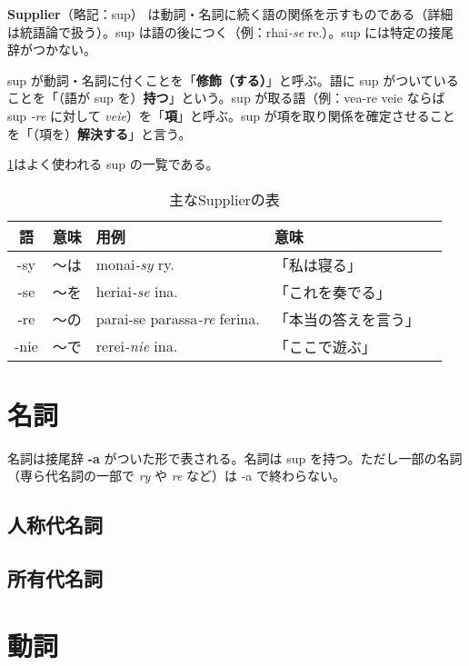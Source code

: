\textbf{Supplier}（略記：sup） は動詞・名詞に続く語の関係を示すものである（詳細は統語論で扱う）。sup は語の後につく（例：rhai\emph{-se} re.）。sup には特定の接尾辞がつかない。

sup が動詞・名詞に付くことを「\textbf{修飾（する）}」と呼ぶ。語に sup がついていることを「（語が sup を）\textbf{持つ}」という。sup が取る語（例：vea-re veie ならば sup \emph{-re} に対して \emph{veie}）を「\textbf{項}」と呼ぶ。sup が項を取り関係を確定させることを「（項を）\textbf{解決する}」と言う。

\cref{table:common-sups}はよく使われる sup の一覧である。

\begin{table}[H]
    \centering
    \caption{主なSupplierの表}
    \label{table:common-sups}
    \begin{tabular}{cclll}
        \toprule
        語 & 意味 & 用例 & 意味 \\
        \midrule
        -sy  & ～は & monai\emph{-sy} ry.                & 「私は寝る」\\
        -se  & ～を & heriai\emph{-se} ina.              & 「これを奏でる」\\
        -re  & ～の & parai-se parassa\emph{-re} ferina. & 「本当の答えを言う」\\
        -nie & ～で & rerei\emph{-nie} ina.              & 「ここで遊ぶ」 \\
        \bottomrule
    \end{tabular}
\end{table}

\section{名詞}

名詞は接尾辞 \textbf{-a} がついた形で表される。名詞は sup を持つ。ただし一部の名詞（専ら代名詞の一部で \emph{ry} や \emph{re} など）は -a で終わらない。

\subsection{人称代名詞}

\subsection{所有代名詞}

\section{動詞}


